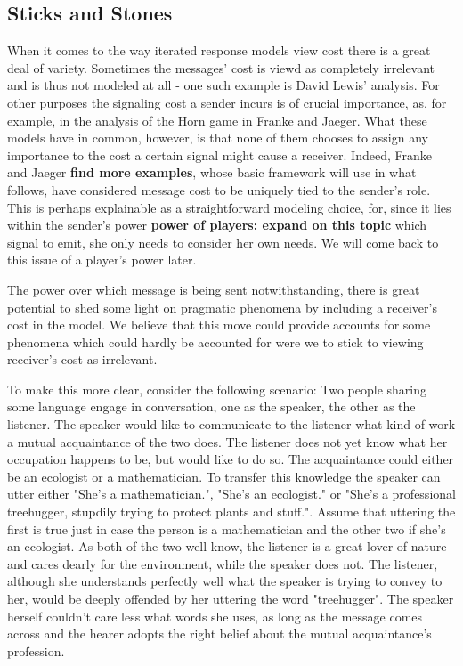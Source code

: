 \documentclass{article}
\begin{document}
\subsection{Sticks and Stones}
When it comes to the way iterated response models view cost there is a great deal of variety. Sometimes the messages' cost is viewd as completely irrelevant and is thus not modeled at all - one such example is David Lewis' analysis.  For other purposes the signaling cost a sender incurs is of crucial importance, as, for example, in the analysis of the Horn game in Franke and Jaeger. What these models have in common, however, is that none of them chooses to assign any importance to the cost a certain signal might cause a receiver. Indeed, Franke and Jaeger \textbf{find more examples}, whose basic framework will use in what follows, have considered message cost to be uniquely tied to the sender's role. This is perhaps explainable as a straightforward modeling choice, for, since it lies within the sender's power \textbf{power of players: expand on this topic} which signal to emit, she only needs to consider her own needs. We will come back to this issue of a player's power later.

The power over which message is being sent notwithstanding, there is great potential to shed some light on pragmatic phenomena by including a receiver's cost in the model. We believe that this move could provide accounts for some phenomena which could hardly be accounted for were we to stick to viewing receiver's cost as irrelevant.

To make this more clear, consider the following scenario: Two people sharing some language engage in conversation, one as the speaker, the other as the listener. The speaker would like to communicate to the listener what kind of work a mutual acquaintance of the two does. The listener does not yet know what her occupation happens to be, but would like to do so. The acquaintance could either be an ecologist or a mathematician. To transfer this knowledge the speaker can utter either "She's a mathematician.", "She's an ecologist." or "She's a professional treehugger, stupdily trying to protect plants and stuff.". Assume that uttering the first is true just in case the person is a mathematician and the other two if she's an ecologist. As both of the two well know, the listener is a great lover of nature and cares dearly for the environment, while the speaker does not. The listener, although she understands perfectly well what the speaker is trying to convey to her, would be deeply offended by her uttering the word "treehugger". The speaker herself couldn't care less what words she uses, as long as the message comes across and the hearer adopts the right belief about the mutual acquaintance's profession.
\end{document}
